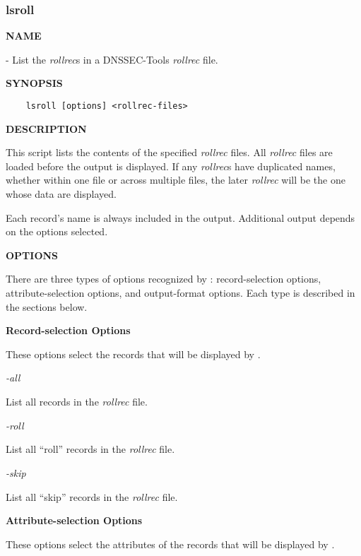 \clearpage

\subsubsection{\bf lsroll}

{\bf NAME}

 - List the {\it rollrec}s in a DNSSEC-Tools {\it rollrec} file.

{\bf SYNOPSIS}

\begin{verbatim}
    lsroll [options] <rollrec-files>
\end{verbatim}

{\bf DESCRIPTION}

This script lists the contents of the specified {\it rollrec} files.  All
{\it rollrec} files are loaded before the output is displayed.  If any
{\it rollrec}s have duplicated names, whether within one file or across
multiple files, the later {\it rollrec} will be the one whose data are
displayed.

Each record's name is always included in the output.  Additional output
depends on the options selected.

{\bf OPTIONS}

There are three types of options recognized by :  record-selection
options, attribute-selection options, and output-format options.  Each type
is described in the sections below.

{\bf Record-selection Options}

These options select the records that will be displayed by .

\begin{description}

\item {\it -all}\verb" "

List all records in the {\it rollrec} file.

\item {\it -roll}\verb" "

List all ``roll'' records in the {\it rollrec} file.

\item {\it -skip}\verb" "

List all ``skip'' records in the {\it rollrec} file.

\end{description}

{\bf Attribute-selection Options}

These options select the attributes of the records that will be displayed
by .

